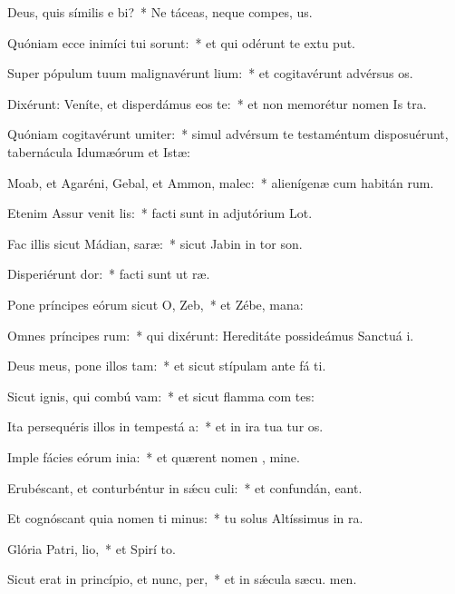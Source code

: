 \item Deus, quis símilis e bi?~* Ne táceas, neque compes, us.
\item Quóniam ecce inimíci tui sorunt:~* et qui odérunt te extu put.
\item Super pópulum tuum malignavérunt lium:~* et cogitavérunt advérsus  os.
\item Dixérunt: Veníte, et disperdámus eos  te:~* et non memorétur nomen Is tra.
\item Quóniam cogitavérunt umiter:~* simul advérsum te testaméntum disposuérunt, tabernácula Idumæórum et Istæ:
\item Moab, et Agaréni, Gebal, et Ammon,  malec:~* alienígenæ cum habitán rum.
\item Etenim Assur venit  lis:~* facti sunt in adjutórium  Lot.
\item Fac illis sicut Mádian,  saræ:~* sicut Jabin in tor son.
\item Disperiérunt  dor:~* facti sunt ut  ræ.
\item Pone príncipes eórum sicut O,  Zeb,~* et Zébe,  mana:
\item Omnes príncipes rum:~* qui dixérunt: Hereditáte possideámus Sanctuá i.
\item Deus meus, pone illos  tam:~* et sicut stípulam ante fá ti.
\item Sicut ignis, qui combú vam:~* et sicut flamma com tes:
\item Ita persequéris illos in tempestá a:~* et in ira tua tur os.
\item Imple fácies eórum inia:~* et quærent nomen , mine.
\item Erubéscant, et conturbéntur in sǽcu culi:~* et confundán,  eant.
\item Et cognóscant quia nomen ti minus:~* tu solus Altíssimus in  ra.
\item Glória Patri,  lio,~* et Spirí to.
\item Sicut erat in princípio, et nunc,  per,~* et in sǽcula sæcu. men.
